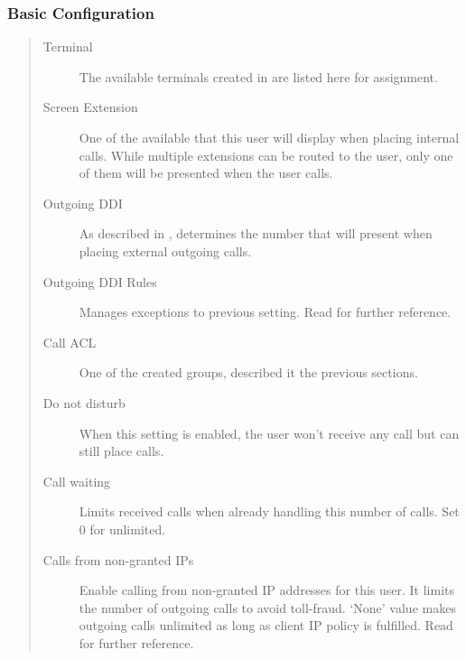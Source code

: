 \documentclass[letterpaper,10pt,spanish]{sphinxmanual}
\begin{document}
\subsubsection{Basic Configuration}
\label{administration_portal/client/vpbx/users:basic-configuration}\begin{quote}
\begin{description}
\item[{Terminal}] \leavevmode
The available terminals created in {\hyperref[administration_portal/client/vpbx/terminals:terminals]{}} are listed here
for assignment.

\item[{Screen Extension}] \leavevmode
One of the available {\hyperref[administration_portal/client/vpbx/extensions:extensions]{}} that this user will display when
placing internal calls. While multiple extensions can be routed to the
user, only one of them will be presented when the user calls.

\item[{Outgoing DDI}] \leavevmode
As described in {\hyperref[getting_started/external_outgoing_calls/outgoing_ddi:external\string-ddi]{}}, determines the number that will
present when placing external outgoing calls.

\item[{Outgoing DDI Rules}] \leavevmode
Manages exceptions to previous setting. Read {\hyperref[administration_portal/client/vpbx/user_configuration/outgoing_ddi_rules:outgoingddi\string-rules]{}}
for further reference.

\item[{Call ACL}] \leavevmode
One of the created {\hyperref[administration_portal/client/vpbx/user_configuration/call_acls:call\string-permissions]{}} groups, described
it the previous sections.

\item[{Do not disturb}] \leavevmode
When this setting is enabled, the user won't receive any call but can
still place calls.

\item[{Call waiting}] \leavevmode
Limits received calls when already handling this number of calls. Set 0 for unlimited.

\item[{Calls from non-granted IPs}] \leavevmode
Enable calling from non-granted IP addresses for this user.
It limits the number of outgoing calls to avoid toll-fraud.
`None' value makes outgoing calls unlimited as long as client IP
policy is fulfilled. Read {\hyperref[security_and_maintenance/security/authorized_ip_ranges:roadwarrior\string-users]{}} for further reference.


\end{description}
\end{quote}
\end{document}

